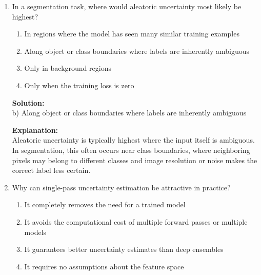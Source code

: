 \documentclass{article}
\begin{document}
\begin{enumerate}
\textbf{Solution:} \\
b) Epistemic uncertainty only

\textbf{Explanation:} \\
Epistemic uncertainty comes from incomplete model knowledge and can often be reduced by collecting more data, improving the architecture, or better exploring the parameter space. Aleatoric uncertainty is tied to the inherent ambiguity or noise in the data and is generally not removable by modeling alone.

\vspace{2mm}

\item In a segmentation task, where would aleatoric uncertainty most likely be highest?

\begin{enumerate}
    \item In regions where the model has seen many similar training examples
    \item Along object or class boundaries where labels are inherently ambiguous
    \item Only in background regions
    \item Only when the training loss is zero
\end{enumerate}

\textbf{Solution:} \\
b) Along object or class boundaries where labels are inherently ambiguous

\textbf{Explanation:} \\
Aleatoric uncertainty is typically highest where the input itself is ambiguous. In segmentation, this often occurs near class boundaries, where neighboring pixels may belong to different classes and image resolution or noise makes the correct label less certain.

\vspace{2mm}

\item Why can single-pass uncertainty estimation be attractive in practice?

\begin{enumerate}
    \item It completely removes the need for a trained model
    \item It avoids the computational cost of multiple forward passes or multiple models
    \item It guarantees better uncertainty estimates than deep ensembles
    \item It requires no assumptions about the feature space
\end{enumerate}


\end{enumerate}
\end{document}
